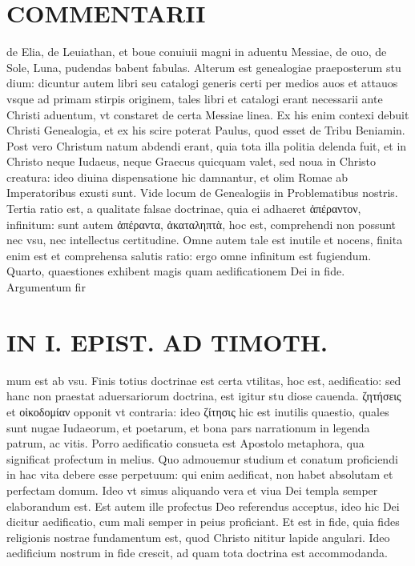 \documentclass{article}
\begin{document}
\begin{pages}
\section*{COMMENTARII }
\marginpar{[ p.20 ]}\pstart de Elia, de Leuiathan, et boue conuiuii magni in aduentu Messiae, de ouo, de Sole, Luna, pudendas babent fabulas.  \pend\pstart Alterum est genealogiae praeposterum stu dium: dicuntur autem libri seu catalogi generis certi per medios auos et attauos vsque ad primam stirpis originem, tales libri et catalogi erant necessarii ante Christi aduentum, vt constaret de certa Messiae linea. Ex his enim contexi debuit Christi Genealogia, et ex his scire poterat Paulus, quod esset de Tribu Beniamin. Post vero Christum natum abdendi erant, quia tota illa politia delenda fuit, et in Christo neque Iudaeus, neque Graecus quicquam valet, sed noua in Christo creatura: ideo diuina dispensatione hic damnantur, et olim Romae ab Imperatoribus exusti sunt. Vide locum de Genealogiis in Problematibus nostris.  \pend\pstart Tertia ratio est, a qualitate falsae doctrinae, quia ei adhaeret ἀπέραντον, infinitum: sunt autem ἀπέραντα, ἀκαταληπτὰ, hoc est, comprehendi non possunt nec vsu, nec intellectus certitudine. Omne autem tale est inutile et nocens, finita enim est et comprehensa salutis ratio: ergo omne infinitum est fugiendum.  \pend\pstart Quarto, quaestiones exhibent magis quam aedificationem Dei in fide. Argumentum fir\pend
\section*{IN I. EPIST. AD TIMOTH. }
\marginpar{[ p.21 ]}\pstart mum est ab vsu. Finis totius doctrinae est certa vtilitas, hoc est, aedificatio: sed hanc non praestat aduersariorum doctrina, est igitur stu diose cauenda. ζητήσεις et οἰκοδομίαν opponit vt contraria: ideo ζίτησις hic est inutilis quaestio, quales sunt nugae Iudaeorum, et poetarum, et bona pars narrationum in legenda patrum, ac vitis. Porro aedificatio consueta est Apostolo metaphora, qua significat profectum in melius. Quo admouemur studium et conatum proficiendi in hac vita debere esse perpetuum: qui enim aedificat, non habet absolutam et perfectam domum. Ideo vt simus aliquando vera et viua Dei templa semper elaborandum est.  \pend\pstart Est autem ille profectus Deo referendus acceptus, ideo hic Dei dicitur aedificatio, cum mali semper in peius proficiant. Et est in fide, quia fides religionis nostrae fundamentum est, quod Christo nititur lapide angulari. Ideo aedificium nostrum in fide crescit, ad quam tota doctrina est accommodanda.  \pend
{}
{}

\end{pages}
\end{document}
